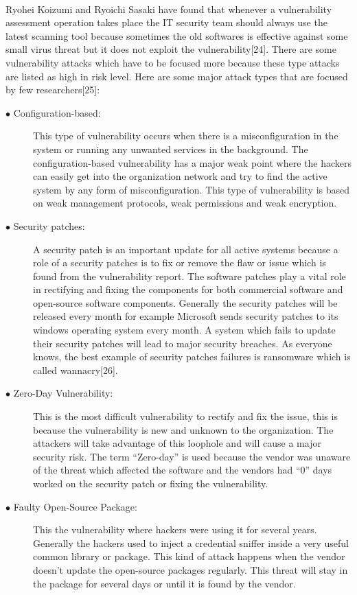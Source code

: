 \paragraph{}
Ryohei Koizumi and Ryoichi Sasaki have found that whenever a vulnerability assessment operation takes place the IT security team should always use the latest scanning tool because sometimes the old softwares is effective against some small virus threat but it does not exploit the vulnerability[24]. There are some vulnerability attacks which have to be focused more because these type attacks are listed as high in risk level. Here are some major attack types that are focused by few researchers[25]:
\begin{description}
	\item [$\bullet$ Configuration-based:] This type of vulnerability occurs when there is a misconfiguration in the system or running any unwanted services in the background. The configuration-based vulnerability has a major weak point where the hackers can easily get into the organization network and try to find the active system by any form of misconfiguration. This type of vulnerability is based on weak management protocols, weak permissions and weak encryption.
	
	\item [$\bullet$ Security patches:] A security patch is an important update for all active systems because a role of a security patches is to fix or remove the flaw or issue which is found from the vulnerability report. The software patches play a vital role in rectifying and fixing the components for both commercial software and open-source software components. Generally the security patches will be released every month for example Microsoft sends security patches to its windows operating system every month. A system which fails to update their security patches will lead to major security breaches. As everyone knows, the best example of security patches failures is ransomware which is called wannacry[26].
	
	\item [$\bullet$ Zero-Day Vulnerability:] This is the most difficult vulnerability to rectify and fix the issue, this is because the vulnerability is new and unknown to the organization. The attackers will take advantage of this loophole and will cause a major security risk. The term “Zero-day” is used because the vendor was unaware of the threat which affected the software and the vendors had “0” days worked on the security patch or fixing the vulnerability.
	
	\item [$\bullet$ Faulty Open-Source Package:] This the vulnerability where hackers were using it for several years. Generally the hackers used to inject a credential sniffer inside a very useful common library or package. This kind of attack happens when the vendor doesn’t update the open-source packages regularly. This threat will stay in the package for several days or until it is found by the vendor.
\end{description}

